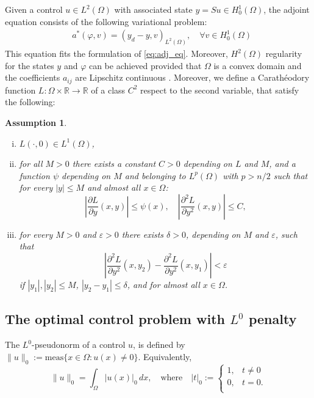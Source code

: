 \documentclass[11pt,a4paper]{amsart}
\renewcommand{\l}{\left}
\renewcommand{\r}{\right}
\newcommand{\om}{\Omega}
\newcommand{\reals}{\mathbb{R}}
\newcounter{theassumption}
\newtheorem{assumption}[theassumption]{{Assumption}}
\newcommand{\norm}[1]{\lVert #1 \rVert}
\begin{document}
Given a control $  u \in L^2(\om)$ with associated state $y=Su \in H_0^1(\om)$, the adjoint equation consists of the following variational problem: 
	\begin{align}\label{eq:costate}
		&a^*(\varphi,v) = (y_d-y,v)_{L^2(\om)}, \quad \forall v \in H_0^1(\om)
	\end{align}	
This equation fits the formulation of \eqref{eq:adj_eq}. Moreover, $H^2(\om)$ regularity for the states $y$ and $\varphi$ can be achieved provided that $\om$ is a convex domain and the coefficients $a_{ij}$ are Lipschitz continuous \cite[Theorem 3.2.1.2]{gri85}. Moreover, we define a Carathéodory function $L:\om\times\reals\to \reals$ of a class $C^2$ respect to the second variable, that satisfy the following: 

\begin{assumption}\label{as:nonlinearities_regularity}
 \begin{enumerate}[(i)]~   
    \item $L(\cdot, 0)\in L^1(\om)$,
    \item for all $M>0$ there exists a constant $C>0$ depending on $L$ and $M$, and a function $\psi$ depending on $M$ and belonging to $L^{p}(\om)$ with $p>n/2$ such that for every $|y|\le M$ and almost all $x\in \om$:
    \[
    \l| \frac{\partial L}{\partial y}(x,y) \r|\le \psi(x),\quad \l|\frac{\partial^2 L}{\partial y^2}(x,y)\r|\le C,
    \]
    \item for every $M > 0$ and $\varepsilon > 0$ there exists $\delta > 0$, depending on $M$ and $\varepsilon$, such that
    \[
    \left| \frac{\partial^2 L}{\partial y^2}(x, y_2) - \frac{\partial^2 L}{\partial y^2}(x, y_1) \right| < \varepsilon 
    \]
    if $|y_1|, |y_2| \leq M$, $ |y_2 - y_1| \leq \delta$, and for almost all $x \in \Omega$.
\end{enumerate}   
\end{assumption}



\subsection{The optimal control problem with $L^0$ penalty}
The $L^0$-pseudonorm of a control $u$, is defined by $\norm{u}_{0}:=\mbox{meas}\{x\in \om: u(x)\ne 0\}$. Equivalently, 
\[
\norm{u}_{0}= \int_\om |u(x)|_0 \,dx , \quad \text{where} \quad  |t|_0:=\begin{cases}    
    1,&t\ne 0\\
    0,&t=0.\\
\end{cases}
\]
\end{document}
